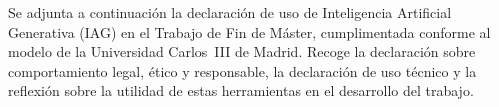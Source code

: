 
Se adjunta a continuación la declaración de uso de Inteligencia Artificial
Generativa (IAG) en el Trabajo de Fin de Máster, cumplimentada conforme al modelo
de la Universidad Carlos~III de Madrid. Recoge la declaración sobre comportamiento
legal, ético y responsable, la declaración de uso técnico y la reflexión sobre la
utilidad de estas herramientas en el desarrollo del trabajo.


